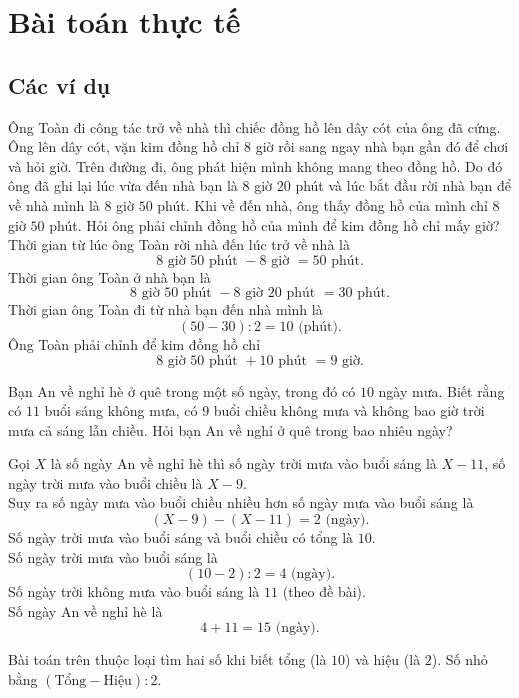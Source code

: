 
\section{Bài toán thực tế}
\subsection{Các ví dụ}
\begin{vd}
	Ông Toàn đi công tác trở về nhà thì chiếc đồng hồ lên dây cót của ông đã cứng. Ông lên dây cót, vặn kim đồng hồ chỉ $8$ giờ rồi sang ngay nhà bạn gần đó để chơi và hỏi giờ. Trên đường đi, ông phát hiện mình không mang theo đồng hồ. Do đó ông đã ghi lại lúc vừa đến nhà bạn là $8$ giờ $20$ phút và lúc bắt đầu rời nhà bạn để về nhà mình là $8$ giờ $50$ phút. Khi về đến nhà, ông thấy đồng hồ của mình chỉ $8$ giờ $50$ phút. Hỏi ông phải chỉnh đồng hồ của mình để kim đồng hồ chỉ mấy giờ?
	\loigiai
	{
		Thời gian từ lúc ông Toàn rời nhà đến lúc trở về nhà là
			\[8\text{ giờ } 50 \text{ phút } - 8 \text{ giờ } = 50 \text{ phút}.\]
		Thời gian ông Toàn ở nhà bạn là
			\[8\text{ giờ } 50 \text{ phút } - 8 \text{ giờ } 20 \text{ phút } = 30 \text{ phút}.\]
		Thời gian ông Toàn đi từ nhà bạn đến nhà mình là
		\[(50-30):2 = 10 \text{ (phút).}\]
		Ông Toàn phải chỉnh để kim đồng hồ chỉ
		\[8 \text{ giờ } 50 \text{ phút } + 10 \text{ phút } = 9 \text{ giờ}.\]
	}
\end{vd}

\begin{vd}
	Bạn An về nghỉ hè ở quê trong một số ngày, trong đó có $10$ ngày mưa. Biết rằng có $11$ buổi sáng không mưa, có $9$ buổi chiều không mưa và không bao giờ trời mưa cả sáng lẫn chiều. Hỏi bạn An về nghỉ ở quê trong bao nhiêu ngày?
	\loigiai
	{
		Gọi $X$ là số ngày An về nghỉ hè thì số ngày trời mưa vào buổi sáng là $X-11$, số ngày trời mưa vào buổi chiều là $X-9$.\\
		Suy ra số ngày mưa vào buổi chiều nhiều hơn số ngày mưa vào buổi sáng là 
		\[(X-9)-(X-11) = 2 \text{ (ngày)}.\]
		Số ngày trời mưa vào buổi sáng và buổi chiều có tổng là $10$.\\
		Số ngày trời mưa vào buổi sáng là
		\[(10-2):2 = 4 \text{ (ngày)}.\]
		Số ngày trời không mưa vào buổi sáng là $11$ (theo đề bài).\\
		Số ngày An về nghỉ hè là 
		\[4+11=15 \text{ (ngày)}.\]
		\begin{note}
			Bài toán trên thuộc loại tìm hai số khi biết tổng (là $10$) và hiệu (là $2$). Số nhỏ bằng $\left(\text{Tổng}-\text{Hiệu}\right):2$.
		\end{note}
	}
\end{vd}

